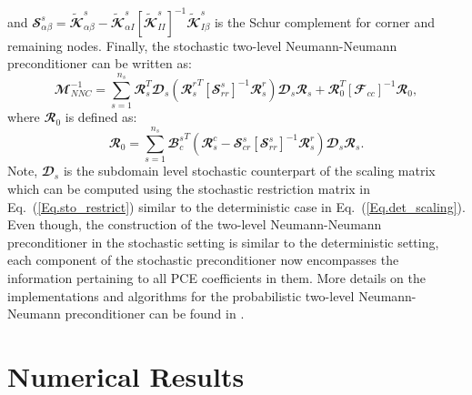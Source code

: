 \documentclass{article}
\begin{document}
and $\mathbfcal{S}^s_{\alpha\beta} = \tilde{\mathbfcal{K}}_{\alpha\beta}^s - \tilde{\mathbfcal{K}}_{\alpha I}^s [\tilde{\mathbfcal{K}}^s _{II}]^{-1} \tilde{\mathbfcal{K}}_{I \beta}^s$ is the Schur complement for corner and remaining nodes. Finally, the stochastic two-level Neumann-Neumann preconditioner can be written as:
\begin{equation}\label{eq:NNCP2}
\mathbfcal{M}_{NNC}^{-1} = \sum_{s=1}^{n_s} \mathbfcal{R}_s^T \mathbfcal{D}_s({\mathbfcal{R}_s^r}^T [\mathbfcal{S}^s_{rr}]^{-1} \mathbfcal{R}_s^r) \mathbfcal{D}_s \mathbfcal{R}_s  + \mathbfcal{R}_0^T [\mathbfcal{F}_{cc}]^{-1} \mathbfcal{R}_0,
\end{equation}
where $\mathbfcal{R}_0$ is defined as:
\begin{equation}
\mathbfcal{R}_0 = \sum_{s=1}^{n_s} {\mathbfcal{B}_c^s}^T ({\mathbfcal{R}_s^c} - \mathbfcal{S}_{cr}^s [\mathbfcal{S}^s_{rr}]^{-1} \mathbfcal{R}_s^r) \mathbfcal{D}_s \mathbfcal{R}_s.
\end{equation}
Note, $\mathbfcal{D}_s$ is the subdomain level stochastic counterpart of the scaling matrix which can be computed using the stochastic restriction matrix in Eq.~(\ref{Eq.sto_restrict}) similar to the deterministic case in Eq.~(\ref{Eq.det_scaling}). \textcolor{ss}{Even though, the construction of the two-level Neumann-Neumann preconditioner in the stochastic setting is similar to the deterministic setting, each component of the stochastic preconditioner now encompasses the information pertaining to all PCE coefficients in them.} More details on the implementations and algorithms for the probabilistic two-level Neumann-Neumann preconditioner can be found in \cite{subber_thesis, ajit_thesis, ajit_CMAM}.



\section{Numerical Results}
\end{document}
